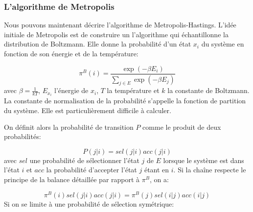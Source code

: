 \subsubsection{L'algorithme de Metropolis}

Nous pouvons maintenant décrire l'algorithme de Metropolis-Hastings. L'idée initiale de Metropolis est de construire un l'algorithme qui échantillonne la distribution de Boltzmann. Elle donne la probabilité d'un état $x_i$ du système en fonction de son énergie et de la température:

\begin{equation}
  \label{eq:Boltzmann}
\pi^B(i) = \frac{\exp(-\beta E_i)}{\sum_{j \in E}\exp(-\beta E_j)} 
\end{equation}
avec $\beta = \frac{1}{kT}$, $E_{x_i}$  l'énergie de $x_i$, $T$ la température et $k$ la constante de Boltzmann. La constante de normalisation de la probabilité s'appelle la fonction de partition du système. Elle est particulièrement difficile à calculer.

On définit alors la probabilité de transition $P$ comme le produit de deux probabilités:

\begin{equation}
  \label{decomp_Metro}
P (j|i) = sel(j|i)acc(j|i)
\end{equation}
avec $sel$ une probabilité de sélectionner l'état $j$ de $E$ lorsque le système est dans l'état $i$ et $acc$ la probabilité d'accepter l'état $j$ étant en $i$. Si la chaîne respecte le principe de la balance détaillée par rapport à $\pi^B$, on a:

\begin{equation}
  \label{balance}
\pi^B(i)sel(j|i)acc(j|i) = \pi^B(j)sel(i|j)acc(i|j) 
\end{equation}
Si on se limite à une probabilité de sélection symétrique:

